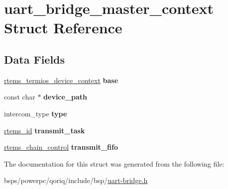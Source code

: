\hypertarget{structuart__bridge__master__context}{}\section{uart\+\_\+bridge\+\_\+master\+\_\+context Struct Reference}
\label{structuart__bridge__master__context}
\subsection*{Data Fields}
\begin{DoxyCompactItemize}
\item 
\mbox{\label{structuart__bridge__master__context_a01c4ccb6ee10c3083e1da18962dfe552}} 
\mbox{\hyperlink{structrtems__termios__device__context}{rtems\+\_\+termios\+\_\+device\+\_\+context}} {\bfseries base}
\item 
\mbox{\label{structuart__bridge__master__context_ac032ff0e95ed92d9ad5c0469ad663f6a}} 
const char $\ast$ {\bfseries device\+\_\+path}
\item 
\mbox{\label{structuart__bridge__master__context_af966242334194c934fc165ca5a3fa24c}} 
intercom\+\_\+type {\bfseries type}
\item 
\mbox{\label{structuart__bridge__master__context_a013e2b02e95608f6b6d9cdbb70bd8113}} 
\mbox{\hyperlink{group__ClassicTasks_gab20892b814dced7dd4e5b9bf42becd57}{rtems\+\_\+id}} {\bfseries transmit\+\_\+task}
\item 
\mbox{\label{structuart__bridge__master__context_a48e84474e22188ab3d76e5e5da341c79}} 
\mbox{\hyperlink{unionChain__Control}{rtems\+\_\+chain\+\_\+control}} {\bfseries transmit\+\_\+fifo}
\end{DoxyCompactItemize}


The documentation for this struct was generated from the following file\+:\begin{DoxyCompactItemize}
\item 
bsps/powerpc/qoriq/include/bsp/\mbox{\hyperlink{uart-bridge_8h}{uart-\/bridge.\+h}}\end{DoxyCompactItemize}
